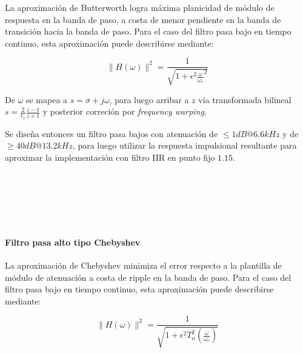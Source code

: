 \documentclass[11pt]{article}
\begin{document}
La aproximación de Butterworth logra máxima planicidad de módulo de
respuesta en la banda de paso, a costa de menor pendiente en la banda de
transición hacia la banda de paso. Para el caso del filtro pasa bajo en
tiempo continuo, esta aproximación puede describirse mediante:

\[
\|H(\omega)\|^2 = \frac{1}{\sqrt{1 + \epsilon^2 \frac{\omega}{\omega_c}^2}}
\]

De \(\omega\) se mapea a \(s = \sigma + j\omega\), para luego arribar a
\(z\) vía transformada bilineal
\(s = \frac{2}{t_s} \frac{z - 1}{z + 1}\) y posterior correción por
\emph{frequency warping}.

Se diseña entonces un filtro pasa bajos con atenuación de
\(\leq 1 dB @ 6.6 kHz\) y de \(\geq 40 dB @ 13.2 kHz\), para luego
utilizar la respuesta impulsional resultante para aproximar la
implementación con filtro IIR en punto fijo \(1.15\).


    \begin{center}
    \end{center}
    { \hspace*{\fill} \\}
    

    \begin{center}
    \end{center}
    { \hspace*{\fill} \\}
    

    \begin{center}
    \end{center}
    { \hspace*{\fill} \\}
    
    \paragraph{Filtro pasa alto tipo
Chebyshev}\label{filtro-pasa-alto-tipo-chebyshev}

La aproximación de Chebyshev minimiza el error respecto a la plantilla
de módulo de atenuación a costa de ripple en la banda de paso. Para el
caso del filtro pasa bajo en tiempo continuo, esta aproximación puede
describirse mediante:

\[
\|H(\omega)\|^2 = \frac{1}{\sqrt{1 + \epsilon^2 T^2_n(\frac{\omega}{\omega_c})}}
\]
\end{document}
